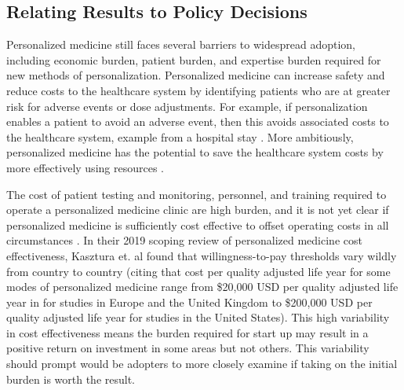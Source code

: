 \subsection{Relating Results to Policy Decisions}

Personalized medicine still faces several barriers to widespread adoption, including economic burden, patient burden, and expertise burden required for new methods of personalization.
Personalized medicine can increase safety and reduce costs to the healthcare system by identifying patients who are at greater risk for adverse events or dose adjustments.  For example, if personalization enables a patient to avoid an adverse event, then this avoids associated costs to the healthcare system, example from a hospital stay \cite{looff2016economic}.  More ambitiously, personalized medicine has the potential to save the healthcare system costs by more effectively using resources \cite{shabaruddin2015economic}. 

The cost of patient testing and monitoring, personnel, and training  required to operate a personalized medicine clinic are high burden, and it is not yet clear if personalized medicine is sufficiently cost effective to offset operating costs in all circumstances \cite{kasztura2019cost}.  In their 2019 scoping review of personalized medicine cost effectiveness, Kasztura et. al \cite{kasztura2019cost} found that willingness-to-pay thresholds vary wildly from country to country (citing that cost per quality adjusted life year for some modes of personalized medicine range from \$20,000 USD per quality adjusted life year in for studies in Europe and the United Kingdom to \$200,000 USD per quality adjusted life year for studies in the United States).  This high variability in cost effectiveness means the burden required for start up may result in a positive return on investment in some areas but not others. This variability should prompt would be adopters to more closely examine if taking on the initial burden is worth the result.

